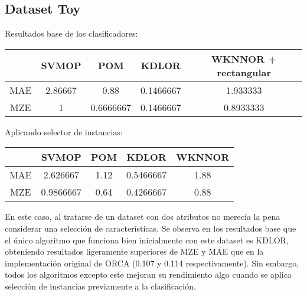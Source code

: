 \subsection{Dataset Toy}
Resultados base de los clasificadores:
\begin{center}
\begin{tabular}{ c c c c c }
	& SVMOP & POM & KDLOR & WKNNOR + rectangular \\
	\hline	
	MAE &   2.86667  & 	0.88 &  0.1466667  & 1.933333 \\
	MZE &	1     &  0.6666667 & 0.1466667 & 0.8933333  \\
	\hline  
\end{tabular}
\end{center}
\vspace{20pt}
Aplicando selector de instancias:
\begin{center}
	
\begin{tabular}{ c c c c c }
	& SVMOP & POM & KDLOR & WKNNOR  \\
	\hline	
	MAE &   2.626667  & 	1.12 &  0.5466667 & 1.88  \\
	MZE &	0.9866667  &  0.64 & 0.4266667 & 0.88  \\
	\hline  
\end{tabular}
\end{center}

En este caso, al tratarse de un dataset con dos atributos no merecía la pena considerar una selección de características. Se observa en los resultados base que el único algoritmo que funciona bien inicialmente con este dataset es KDLOR, obteniendo resultados ligeramente superiores de MZE y MAE que en la implementación original de ORCA \cite{Gutiérrez2016} (0.107 y 0.114 respectivamente). Sin embargo, todos los algoritmos excepto este mejoran su rendimiento algo cuando se aplica selección de instancias previamente a la clasificación.

